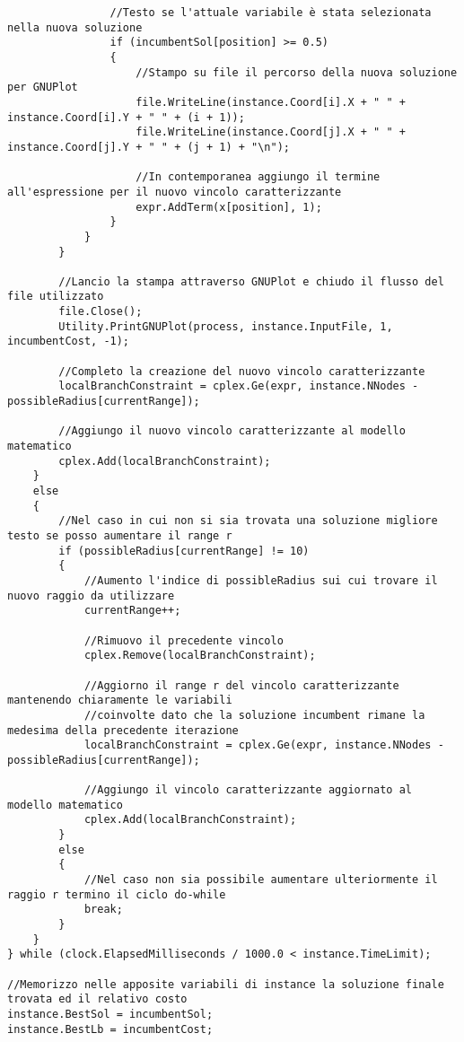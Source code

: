 \documentclass[11pt]{article}
\begin{document}
\begin{lstlisting}
                //Testo se l'attuale variabile è stata selezionata nella nuova soluzione
                if (incumbentSol[position] >= 0.5)
                {
                    //Stampo su file il percorso della nuova soluzione per GNUPlot
                    file.WriteLine(instance.Coord[i].X + " " + instance.Coord[i].Y + " " + (i + 1));
                    file.WriteLine(instance.Coord[j].X + " " + instance.Coord[j].Y + " " + (j + 1) + "\n");

                    //In contemporanea aggiungo il termine all'espressione per il nuovo vincolo caratterizzante
                    expr.AddTerm(x[position], 1);
                }
            }
        }

        //Lancio la stampa attraverso GNUPlot e chiudo il flusso del file utilizzato
        file.Close();
        Utility.PrintGNUPlot(process, instance.InputFile, 1, incumbentCost, -1);

        //Completo la creazione del nuovo vincolo caratterizzante
        localBranchConstraint = cplex.Ge(expr, instance.NNodes - possibleRadius[currentRange]);

        //Aggiungo il nuovo vincolo caratterizzante al modello matematico
        cplex.Add(localBranchConstraint);
    }
    else
    {
        //Nel caso in cui non si sia trovata una soluzione migliore testo se posso aumentare il range r
        if (possibleRadius[currentRange] != 10)
        {
            //Aumento l'indice di possibleRadius sui cui trovare il nuovo raggio da utilizzare
            currentRange++;

            //Rimuovo il precedente vincolo
            cplex.Remove(localBranchConstraint);

            //Aggiorno il range r del vincolo caratterizzante mantenendo chiaramente le variabili
            //coinvolte dato che la soluzione incumbent rimane la medesima della precedente iterazione
            localBranchConstraint = cplex.Ge(expr, instance.NNodes - possibleRadius[currentRange]);

            //Aggiungo il vincolo caratterizzante aggiornato al modello matematico
            cplex.Add(localBranchConstraint);
        }
        else
        {
            //Nel caso non sia possibile aumentare ulteriormente il raggio r termino il ciclo do-while
            break;
        }
    }
} while (clock.ElapsedMilliseconds / 1000.0 < instance.TimeLimit);

//Memorizzo nelle apposite variabili di instance la soluzione finale trovata ed il relativo costo
instance.BestSol = incumbentSol;
instance.BestLb = incumbentCost;

\end{lstlisting}
\end{document}
